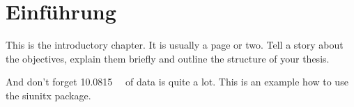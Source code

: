 \chapter{Einführung}
This is the introductory chapter.
It is usually a page or two.
Tell a story about the objectives, explain them briefly and outline the structure of your thesis.

And don't forget \SI{10.0815}{\giga\byte} of data is quite a lot.
This is an example how to use the siunitx package.

